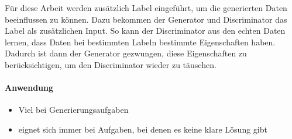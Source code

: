 Für diese Arbeit werden zusätzlich Label eingeführt, um die generierten Daten beeinflussen zu können.
Dazu bekommen der Generator und Discriminator das Label als zusätzlichen Input.
So kann der Discriminator aus den echten Daten lernen, dass Daten bei bestimmten Labeln bestimmte Eigenschaften haben.
Dadurch ist dann der Generator gezwungen, diese Eigenschaften zu berücksichtigen, um den Discriminator wieder zu täuschen.
\newline


\paragraph{Anwendung}
\begin{itemize}
	\item Viel bei Generierungsaufgaben
	\item eignet sich immer bei Aufgaben, bei denen es keine klare Lösung gibt
\end{itemize}


